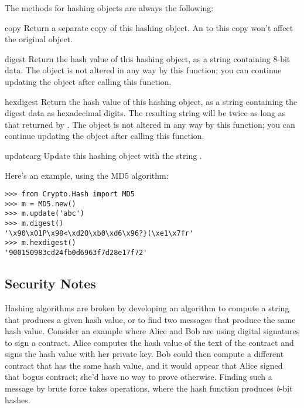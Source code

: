 \documentclass{howto}
\begin{document}
The methods for hashing objects are always the following:

\begin{methoddesc}{copy}{}
Return a separate copy of this hashing object.  An  to
this copy won't affect the original object.
\end{methoddesc}

\begin{methoddesc}{digest}{}
Return the hash value of this hashing object, as a string containing
8-bit data.  The object is not altered in any way by this function;
you can continue updating the object after calling this function.
\end{methoddesc}

\begin{methoddesc}{hexdigest}{}
Return the hash value of this hashing object, as a string containing
the digest data as hexadecimal digits.  The resulting string will be
twice as long as that returned by .  The object is not
altered in any way by this function; you can continue updating the
object after calling this function.
\end{methoddesc}

\begin{methoddesc}{update}{arg}
Update this hashing object with the string .
\end{methoddesc}

Here's an example, using the MD5 algorithm:

\begin{verbatim}
>>> from Crypto.Hash import MD5
>>> m = MD5.new()
>>> m.update('abc')
>>> m.digest()
'\x90\x01P\x98<\xd2O\xb0\xd6\x96?}(\xe1\x7fr'
>>> m.hexdigest()
'900150983cd24fb0d6963f7d28e17f72'
\end{verbatim}


\subsection{Security Notes}

Hashing algorithms are broken by developing an algorithm to compute a
string that produces a given hash value, or to find two messages that
produce the same hash value. Consider an example where Alice and Bob
are using digital signatures to sign a contract.  Alice computes the
hash value of the text of the contract and signs the hash value with
her private key.  Bob could then compute a different contract that has
the same hash value, and it would appear that Alice signed that bogus
contract; she'd have no way to prove otherwise.  Finding such a
message by brute force takes  operations, where the
hash function produces \emph{b}-bit hashes.
\end{document}
